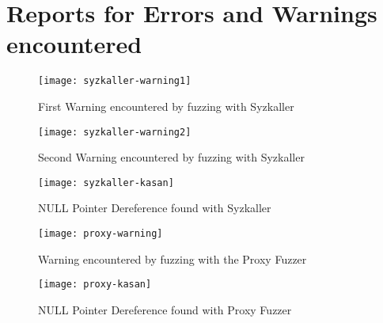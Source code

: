 \appendix
\section{Reports for Errors and Warnings encountered}\label{s:app-err}

\begin{figure}[h!]
  \centering
  \texttt{[image: syzkaller-warning1]}
  \caption{First Warning encountered by fuzzing with Syzkaller}
\end{figure}

\begin{figure}[h!]
  \centering
  \texttt{[image: syzkaller-warning2]}
  \caption{Second Warning encountered by fuzzing with Syzkaller}
\end{figure}

\begin{figure}[h!]
  \centering
  \texttt{[image: syzkaller-kasan]}
  \caption{NULL Pointer Dereference found with Syzkaller}
\end{figure}

\begin{figure}[h!]
  \centering
  \texttt{[image: proxy-warning]}
  \caption{Warning encountered by fuzzing with the Proxy Fuzzer}
\end{figure}

\begin{figure}[h!]
  \centering
  \texttt{[image: proxy-kasan]}
  \caption{NULL Pointer Dereference found with Proxy Fuzzer}
\end{figure}
